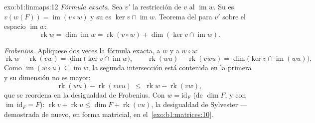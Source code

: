 \begin{solution}{exo:b1:linmaps:12}
\emph{Fórmula exacta.} Sea $v'$ la restricción de $v$ al
 $\operatorname{im} w$. Su  es
$v(w(F)) = \operatorname{im}(v \circ w)$ y su  es
$\ker v \cap \operatorname{im} w$. Teorema del  para $v'$ sobre
el espacio $\operatorname{im} w$:
\[
\operatorname{rk} w = \dim\operatorname{im} w
= \operatorname{rk}(v \circ w) + \dim(\ker v \cap
\operatorname{im} w) .
\]

\emph{Frobenius.} Aplíquese dos veces la fórmula exacta, a $w$ y a
$w \circ u$:
\[
\operatorname{rk} w - \operatorname{rk}(vw)
= \dim\bigl(\ker v \cap \operatorname{im} w\bigr),
\qquad
\operatorname{rk}(wu) - \operatorname{rk}(vwu)
= \dim\bigl(\ker v \cap \operatorname{im}(wu)\bigr) .
\]
Como $\operatorname{im}(w \circ u) \subseteq \operatorname{im} w$, la
segunda intersección está contenida en la primera y su dimensión no
es mayor:
\[
\operatorname{rk}(wu) - \operatorname{rk}(vwu)
\;\leq\; \operatorname{rk} w - \operatorname{rk}(vw) ,
\]
que se reordena en la desigualdad de Frobenius. Con
$w = \mathrm{id}_F$ (de  $\dim F$, y con
$\operatorname{im}\, \mathrm{id}_F = F$):
$\operatorname{rk} v + \operatorname{rk} u \leq \dim F +
\operatorname{rk}(vu)$, la desigualdad de Sylvester --- demostrada de
nuevo, en forma matricial, en el~\cref{exo:b1:matrices:10}.
\end{solution}

